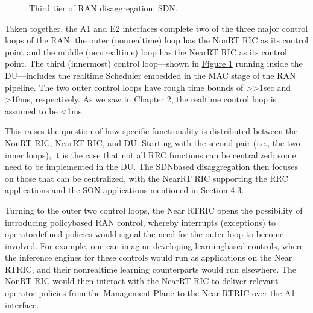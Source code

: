 \documentclass[a4paper,11pt,english]{sphinxmanual}
\let\sphinxpxdimen\pdfpxdimen\else\newdimen\sphinxpxdimen
\begin{document}
\begin{figure}[ht]
\centering
\capstart

\noindent\sphinxincludegraphics[width=800\sphinxpxdimen]{{Slide92}.png}
\caption{Third tier of RAN disaggregation: SDN.}\label{\detokenize{ran:id14}}\label{\detokenize{ran:fig-ctl-loops}}\end{figure}

\sphinxAtStartPar
Taken together, the A1 and E2 interfaces complete two of the three
major control loops of the RAN: the outer (non\sphinxhyphen{}real\sphinxhyphen{}time) loop has the
Non\sphinxhyphen{}RT RIC as its control point and the middle (near\sphinxhyphen{}real\sphinxhyphen{}time) loop
has the Near\sphinxhyphen{}RT RIC as its control point. The third (innermost)
control loop—shown in \hyperref[\detokenize{ran:fig-ctl-loops}]{Figure \ref{\detokenize{ran:fig-ctl-loops}}} running
inside the DU—includes the real\sphinxhyphen{}time Scheduler embedded in the MAC
stage of the RAN pipeline. The two outer control loops have rough time
bounds of \textgreater{}\textgreater{}1sec and \textgreater{}10ms, respectively. As we saw in Chapter 2,
the real\sphinxhyphen{}time control loop is assumed to be \textless{}1ms.

\sphinxAtStartPar
This raises the question of how specific functionality is distributed
between the Non\sphinxhyphen{}RT RIC, Near\sphinxhyphen{}RT RIC, and DU. Starting with the second
pair (i.e., the two inner loops), it is the case that not all RRC
functions can be centralized; some need to be implemented in the
DU. The SDN\sphinxhyphen{}based disaggregation then focuses on those that can be
centralized, with the Near\sphinxhyphen{}RT RIC supporting the RRC applications and
the SON applications mentioned in Section 4.3.

\sphinxAtStartPar
Turning to the outer two control loops, the Near RT\sphinxhyphen{}RIC opens the
possibility of introducing policy\sphinxhyphen{}based RAN control, whereby
interrupts (exceptions) to operator\sphinxhyphen{}defined policies would signal the
need for the outer loop to become involved. For example, one can
imagine developing learning\sphinxhyphen{}based controls, where the inference
engines for these controls would run as applications on the Near
RT\sphinxhyphen{}RIC, and their non\sphinxhyphen{}real\sphinxhyphen{}time learning counterparts would run
elsewhere. The Non\sphinxhyphen{}RT RIC would then interact with the Near\sphinxhyphen{}RT RIC to
deliver relevant operator policies from the Management Plane to the
Near RT\sphinxhyphen{}RIC over the A1 interface.
\end{document}
